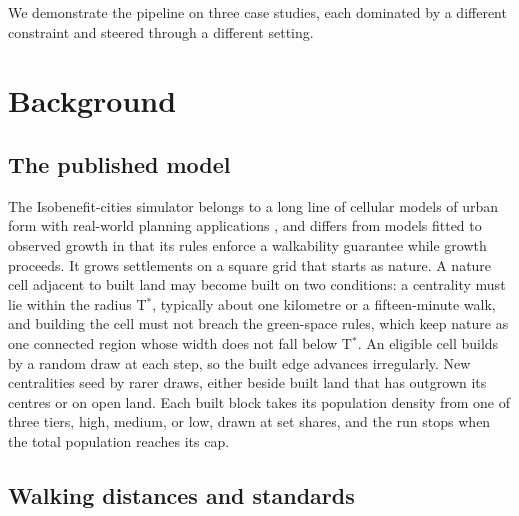 \documentclass[11pt]{article}
\begin{document}
We demonstrate the pipeline on three case studies, each dominated by a
different constraint and steered through a different setting.

\section{Background}
\label{sec:background}

\subsection{The published model}

The Isobenefit-cities simulator \citep{dacci_voto2023} belongs to a
long line of cellular models of urban form with real-world planning
applications \citep{white_engelen1993, clarke1997,
batty2005, sante2010}, and differs from models fitted to observed
growth in that its rules enforce a walkability guarantee while growth
proceeds. It grows settlements on a
square grid that starts as nature. A nature cell adjacent to built land may
become built on two conditions: a centrality must lie within the
radius T\(^*\), typically about one kilometre or a fifteen-minute
walk, and building the cell must not breach the green-space rules,
which keep nature as one connected region whose width does not fall
below T\(^*\). An eligible cell builds by a random draw at each
step, so the built edge advances irregularly. New
centralities seed by rarer draws, either beside built land that has
outgrown its centres or on open land. Each built block takes its
population density from one of three tiers, high, medium, or low,
drawn at set shares, and the run stops when the total population
reaches its cap.

\subsection{Walking distances and standards}
\end{document}

